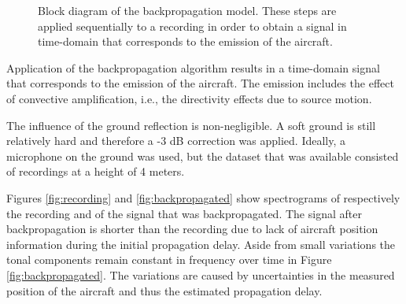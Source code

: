\begin{figure}[H]
  \centering
{}
  \caption{Block diagram of the backpropagation model. These steps are applied sequentially to a recording in order to obtain a signal in time-domain that corresponds to the emission of the aircraft.}
  \label{fig:backpropagation_block_diagram}
\end{figure}

Application of the backpropagation algorithm results in a time-domain signal
that corresponds to the emission of the aircraft. The emission includes the
effect of convective amplification, i.e., the directivity effects due to source
motion.

The influence of the ground reflection is non-negligible. A soft ground is still
relatively hard and therefore a -3 dB correction was applied. Ideally, a
microphone on the ground was used, but the dataset that was available consisted
of recordings at a height of 4 meters.

Figures \ref{fig:recording} and \ref{fig:backpropagated} show spectrograms of
respectively the recording and of the signal that was backpropagated. The signal
after backpropagation is shorter than the recording due to lack of aircraft
position information during the initial propagation delay.
Aside from small variations the tonal components remain constant in frequency
over time in Figure \ref{fig:backpropagated}. The variations are caused
by uncertainties in the measured position of the aircraft and thus the estimated
propagation delay.


